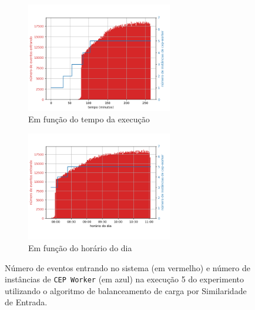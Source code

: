 \begin{figure}[h]
\begin{subfigure}{\textwidth}
\centering
\includegraphics[width=0.7\textwidth]{figuras/graphics/carga_e_workers_total10-dez-is.png}
\caption{Em função do tempo da execução}
\label{fig:workers_and_load_total-10-dez-is}
\end{subfigure}

\begin{subfigure}{\textwidth}
\centering
\includegraphics[width=0.7\textwidth]{figuras/graphics/carga_e_workers_horario10-dez-is.png}
\caption{Em função do horário do dia}
\label{fig:workers_and_load_SPtrans-10-dez-is}
\end{subfigure}%
\caption{Número de eventos entrando no sistema (em vermelho) e número de instâncias de \texttt{CEP Worker} (em azul) na execução 5 do experimento utilizando o algoritmo de balanceamento de carga por Similaridade de Entrada.}
\end{figure}





